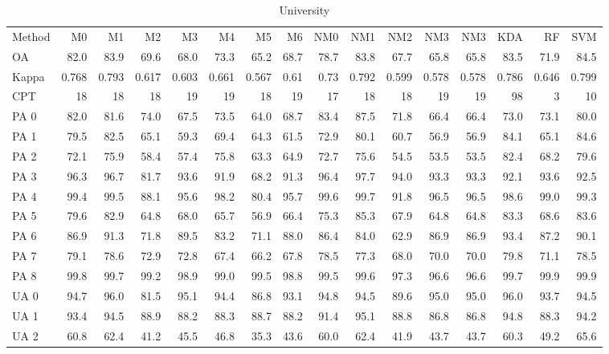 \documentclass[a4paper,10pt,DIV=16]{scrartcl}
\begin{document}
\begin{table}[h]
  \footnotesize
  \centering
  \caption{University}
  \begin{tabular}{lrrrrrrrrrrrrrrr}
    Method & M0 & M1 & M2 & M3 & M4 & M5 & M6 & NM0 & NM1 & NM2 & NM3 & NM3 & KDA & RF & SVM \\
    OA & 82.0 & 83.9 & 69.6 & 68.0 & 73.3 & 65.2 & 68.7 & 78.7 & 83.8 & 67.7 & 65.8 & 65.8 & 83.5 & 71.9 & 84.5 \\
    Kappa & 0.768 & 0.793 & 0.617 & 0.603 & 0.661 & 0.567 & 0.61 & 0.73 & 0.792 & 0.599 & 0.578 & 0.578 & 0.786 & 0.646 & 0.799 \\
    CPT & 18 & 18 & 18 & 19 & 19 & 18 & 19 & 17 & 18 & 18 & 19 & 19 & 98 & 3 & 10 \\
    PA 0 & 82.0 & 81.6 & 74.0 & 67.5 & 73.5 & 64.0 & 68.7 & 83.4 & 87.5 & 71.8 & 66.4 & 66.4 & 73.0 & 73.1 & 80.0 \\
    PA 1 & 79.5 & 82.5 & 65.1 & 59.3 & 69.4 & 64.3 & 61.5 & 72.9 & 80.1 & 60.7 & 56.9 & 56.9 & 84.1 & 65.1 & 84.6 \\
    PA 2 & 72.1 & 75.9 & 58.4 & 57.4 & 75.8 & 63.3 & 64.9 & 72.7 & 75.6 & 54.5 & 53.5 & 53.5 & 82.4 & 68.2 & 79.6 \\
    PA 3 & 96.3 & 96.7 & 81.7 & 93.6 & 91.9 & 68.2 & 91.3 & 96.4 & 97.7 & 94.0 & 93.3 & 93.3 & 92.1 & 93.6 & 92.5 \\
    PA 4 & 99.4 & 99.5 & 88.1 & 95.6 & 98.2 & 80.4 & 95.7 & 99.6 & 99.7 & 91.8 & 96.5 & 96.5 & 98.6 & 99.0 & 99.3 \\
    PA 5 & 79.6 & 82.9 & 64.8 & 68.0 & 65.7 & 56.9 & 66.4 & 75.3 & 85.3 & 67.9 & 64.8 & 64.8 & 83.3 & 68.6 & 83.6 \\
    PA 6 & 86.9 & 91.3 & 71.8 & 89.5 & 83.2 & 71.1 & 88.0 & 86.4 & 84.0 & 62.9 & 86.9 & 86.9 & 93.4 & 87.2 & 90.1 \\
    PA 7 & 79.1 & 78.6 & 72.9 & 72.8 & 67.4 & 66.2 & 67.8 & 78.5 & 77.3 & 68.0 & 70.0 & 70.0 & 79.8 & 71.1 & 78.5 \\
    PA 8 & 99.8 & 99.7 & 99.2 & 98.9 & 99.0 & 99.5 & 98.8 & 99.5 & 99.6 & 97.3 & 96.6 & 96.6 & 99.7 & 99.9 & 99.9 \\
    UA 0 & 94.7 & 96.0 & 81.5 & 95.1 & 94.4 & 86.8 & 93.1 & 94.8 & 94.5 & 89.6 & 95.0 & 95.0 & 96.0 & 93.7 & 94.5 \\
    UA 1 & 93.4 & 94.5 & 88.9 & 88.2 & 88.3 & 88.7 & 88.2 & 91.4 & 95.1 & 88.8 & 86.8 & 86.8 & 94.8 & 88.3 & 94.2 \\
    UA 2 & 60.8 & 62.4 & 41.2 & 45.5 & 46.8 & 35.3 & 43.6 & 60.0 & 62.4 & 41.9 & 43.7 & 43.7 & 60.3 & 49.2 & 65.6 \\

\end{tabular}
\end{table}
\end{document}
